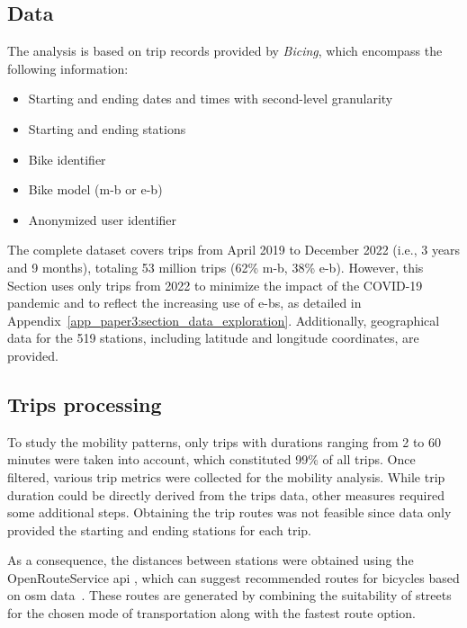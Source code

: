 \subsection{Data}

The analysis is based on trip records provided by \textit{Bicing}, which encompass the following information:

\vspace{-1.1em}
\begin{itemize}\setlength\itemsep{0em}
    \item Starting and ending dates and times with second-level granularity
    \item Starting and ending stations
    \item Bike identifier
    \item Bike model (\ac{m-b} or \ac{e-b})
    \item Anonymized user identifier
\end{itemize}
\vspace{-0.6em}

The complete dataset covers trips from April 2019 to December 2022 (i.e., 3 years and 9 months), totaling 53 million trips (62\% \ac{m-b}, 38\% \ac{e-b}). However, this Section uses only trips from 2022 to minimize the impact of the COVID-19 pandemic and to reflect the increasing use of \acp{e-b}, as detailed in Appendix~\ref{app_paper3:section_data_exploration}. Additionally, geographical data for the 519 stations, including latitude and longitude coordinates, are provided.

    
    \subsection{Trips processing} \label{section_trips_processing}
  
    To study the mobility patterns, only trips with durations ranging from 2 to 60 minutes were taken into account, which constituted 99\% of all trips. Once filtered, various trip metrics were collected for the mobility analysis. While trip duration could be directly derived from the trips data, other measures required some additional steps. Obtaining the trip routes was not feasible since data only provided the starting and ending stations for each trip.

    As a consequence, the distances between stations were obtained using the OpenRouteService \ac{api} \cite{OpenRouteService_2023}, which can suggest recommended routes for bicycles based on \ac{osm} data~\cite{OpenStreetMap_2023}. These routes are generated by combining the suitability of streets for the chosen mode of transportation along with the fastest route option. 

